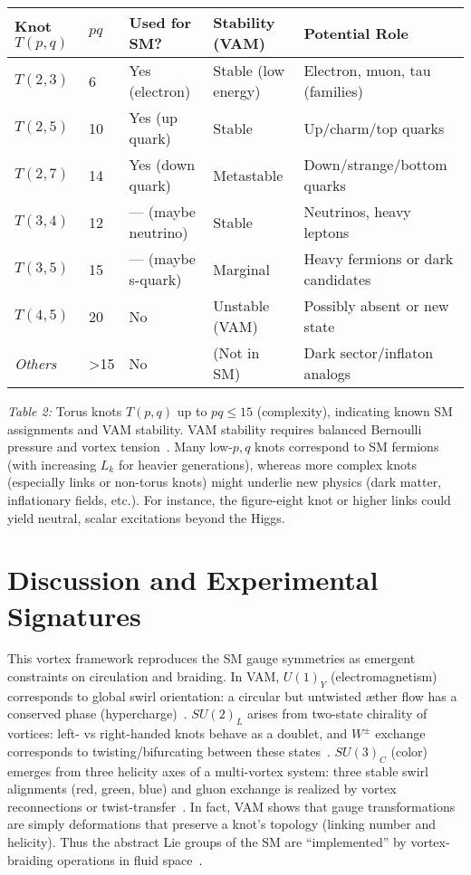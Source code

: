 \documentclass[a4paper,12pt]{article}
\begin{document}
\begin{table}
    \centering
    \begin{tabular}{lllll}
        \toprule
        \textbf{Knot $T(p,q)$} & \textbf{$pq$} & \textbf{Used for SM?} & \textbf{Stability (VAM)} & \textbf{Potential Role} \\
        \midrule
        $T(2,3)$ & 6 & Yes (electron) & Stable (low energy) & Electron, muon, tau (families) \\
        $T(2,5)$ & 10 & Yes (up quark) & Stable & Up/charm/top quarks \\
        $T(2,7)$ & 14 & Yes (down quark) & Metastable & Down/strange/bottom quarks \\
        $T(3,4)$ & 12 & — (maybe neutrino) & Stable & Neutrinos, heavy leptons \\
        $T(3,5)$ & 15 & — (maybe s-quark) & Marginal & Heavy fermions or dark candidates \\
        $T(4,5)$ & 20 & No & Unstable (VAM) & Possibly absent or new state \\
        \textit{Others} & >15 & No & (Not in SM) & Dark sector/inflaton analogs \\
        \bottomrule
    \end{tabular}
    \caption{}
    \label{tab:}
\end{table}



\textit{Table 2:} Torus knots $T(p,q)$ up to $pq\leq 15$ (complexity), indicating known SM assignments and VAM stability. VAM stability requires balanced Bernoulli pressure and vortex tension~\cite{Appendix_CalculateNeucleusMass, 4-StandardModel-Lagrangian-VAM}. Many low-$p,q$ knots correspond to SM fermions (with increasing $L_k$ for heavier generations), whereas more complex knots (especially links or non-torus knots) might underlie new physics (dark matter, inflationary fields, etc.). For instance, the figure-eight knot or higher links could yield neutral, scalar excitations beyond the Higgs.

\section*{Discussion and Experimental Signatures}
This vortex framework reproduces the SM gauge symmetries as emergent constraints on circulation and braiding. In VAM, $U(1)_Y$ (electromagnetism) corresponds to global swirl orientation: a circular but untwisted æther flow has a conserved phase (hypercharge)~\cite{4-StandardModel-Lagrangian-VAM}. $SU(2)_L$ arises from two-state chirality of vortices: left- vs right-handed knots behave as a doublet, and $W^\pm$ exchange corresponds to twisting/bifurcating between these states~\cite{4-StandardModel-Lagrangian-VAM}. $SU(3)_C$ (color) emerges from three helicity axes of a multi-vortex system: three stable swirl alignments (red, green, blue) and gluon exchange is realized by vortex reconnections or twist-transfer~\cite{4-StandardModel-Lagrangian-VAM}. In fact, VAM shows that gauge transformations are simply deformations that preserve a knot’s topology (linking number and helicity). Thus the abstract Lie groups of the SM are “implemented” by vortex-braiding operations in fluid space~\cite{4-StandardModel-Lagrangian-VAM}.
\end{document}
